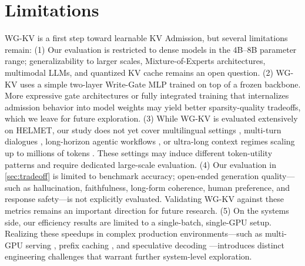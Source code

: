 \section*{Limitations}

WG-KV is a first step toward learnable KV Admission, but several limitations remain: 
(1) Our evaluation is restricted to dense models in the 4B--8B parameter range; generalizability to larger scales, Mixture-of-Experts architectures, multimodal LLMs, and quantized KV cache \cite{kvquant} remains an open question.
(2) WG-KV uses a simple two-layer Write-Gate MLP trained on top of a frozen backbone. More expressive gate architectures or fully integrated training that internalizes admission behavior into model weights may yield better sparsity-quality tradeoffs, which we leave for future exploration.
(3) While WG-KV is evaluated extensively on HELMET, our study does not yet cover multilingual settings \cite{oneruler}, multi-turn dialogues \cite{multichallenge}, long-horizon agentic workflows \cite{worfbench}, or ultra-long context regimes scaling up to millions of tokens \cite{longcodebench}. These settings may induce different token-utility patterns and require dedicated large-scale evaluation.
(4) Our evaluation in \cref{sec:tradeoff} is limited to benchmark accuracy; open-ended generation quality---such as hallucination, faithfulness, long-form coherence, human preference, and response safety---is not explicitly evaluated. Validating WG-KV against these metrics remains an important direction for future research.
(5) On the systems side, our efficiency results are limited to a single-batch, single-GPU setup. Realizing these speedups in complex production environments---such as multi-GPU serving \cite{helix}, prefix caching \cite{kvflow}, and speculative decoding \cite{specinfer}---introduces distinct engineering challenges that warrant further system-level exploration.
